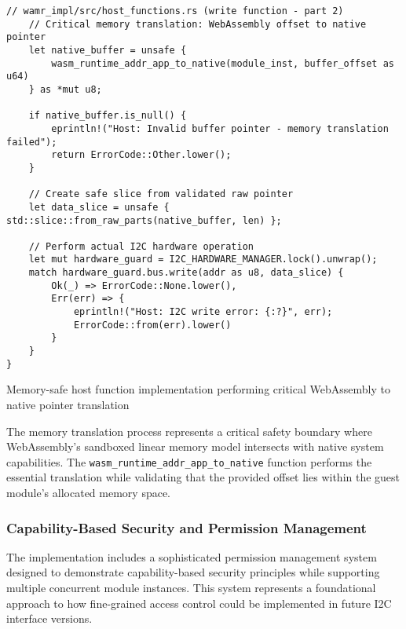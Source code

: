 \begin{listing}[H]
\begin{verbatim}
// wamr_impl/src/host_functions.rs (write function - part 2)
    // Critical memory translation: WebAssembly offset to native pointer
    let native_buffer = unsafe {
        wasm_runtime_addr_app_to_native(module_inst, buffer_offset as u64)
    } as *mut u8;
    
    if native_buffer.is_null() {
        eprintln!("Host: Invalid buffer pointer - memory translation failed");
        return ErrorCode::Other.lower();
    }

    // Create safe slice from validated raw pointer
    let data_slice = unsafe { std::slice::from_raw_parts(native_buffer, len) };
    
    // Perform actual I2C hardware operation
    let mut hardware_guard = I2C_HARDWARE_MANAGER.lock().unwrap();
    match hardware_guard.bus.write(addr as u8, data_slice) {
        Ok(_) => ErrorCode::None.lower(),
        Err(err) => {
            eprintln!("Host: I2C write error: {:?}", err);
            ErrorCode::from(err).lower()
        }
    }
}
\end{verbatim}
\caption{Memory-safe host function implementation performing critical WebAssembly to native pointer translation}
\label{lst:wamr-host-function-pt2}
\end{listing}

The memory translation process represents a critical safety boundary where WebAssembly's sandboxed linear memory model intersects with native system capabilities. The \texttt{wasm\_runtime\_addr\_app\_to\_native} function performs the essential translation while validating that the provided offset lies within the guest module's allocated memory space.

\subsubsection{Capability-Based Security and Permission Management}

The implementation includes a sophisticated permission management system designed to demonstrate capability-based security principles while supporting multiple concurrent module instances. This system represents a foundational approach to how fine-grained access control could be implemented in future I2C interface versions.

